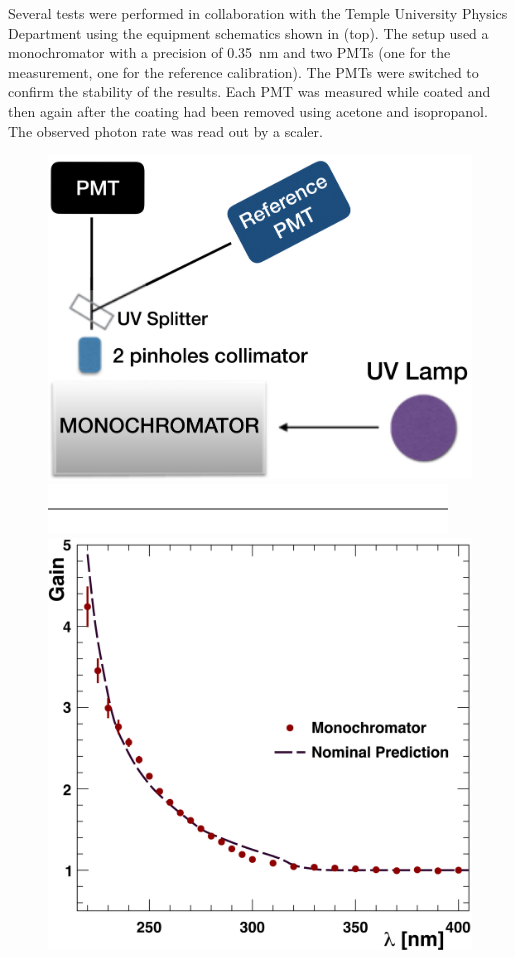 Several tests were performed in collaboration with the Temple University Physics Department using the equipment
schematics shown in  (top). The setup used a monochromator with a precision
of 0.35~nm and two PMTs (one for the measurement, one for the   reference calibration). The PMTs were switched
to confirm the stability of the results. Each PMT was measured while coated and then again after the coating had
been removed using acetone and isopropanol. The observed photon rate was read out by a scaler.

\begin{figure}
	\centering
	\includegraphics[width=0.99\columnwidth, height=0.65\columnwidth]{img/pmtTestingSetup.png}
	\includegraphics[width=0.99\columnwidth, keepaspectratio]{img/blank.png}
	\includegraphics[width=0.99\columnwidth, keepaspectratio]{img/ptQEResults.png}

\end{figure}
